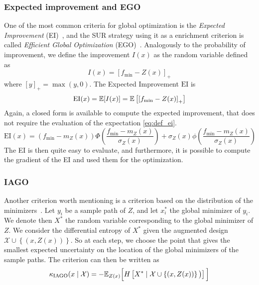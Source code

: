 \documentclass[../../Main_ManuscritThese.tex]{subfiles}
\begin{document}
\subsubsection{Expected improvement and EGO}
One of the most common criteria for global optimization is the \emph{Expected Improvement} (EI)~\cite{mockus_bayesian_1974}, and the SUR strategy using it as a enrichment criterion is called \emph{Efficient Global Optimization} (EGO)~\cite{jones_efficient_1998}.
Analogously to the probability of improvement, we define the improvement $I(x)$ as the random variable defined as
\begin{equation}
  \label{eq:def_improvement}
  I(x) = {\left[f_{\min} - Z(x)\right]}_+
\end{equation}
where $[y]_+ = \max(y, 0)$.
The Expected Improvement $\mathrm{EI}$ is 
\begin{align}
  \label{eq:def_ei}
  \mathrm{EI}(x) = \mathbb{E}[I(x)]  = \mathbb{E}\left[\left[f_{\min} - Z(x) \right]_+\right]
\end{align}
Again, a closed form is available to compute the expected improvement, that does not require the evaluation of the expectation \cref{eq:def_ei}.
\begin{equation}
  \mathrm{EI}(x) = \left(f_{\min} - m_Z(x)\right) \Phi\left(\frac{f_{\min} - m_Z(x)}{\sigma_Z(x)}\right) + \sigma_Z(x) \phi\left(\frac{f_{\min} - m_Z(x)}{\sigma_Z(x)}\right)
\end{equation}
The EI is then quite easy to evaluate, and furthermore, it is possible to compute the gradient of the EI and used them for the optimization.

\subsubsection{IAGO}
\label{ssec:IAGO} Another criterion worth mentioning is a criterion based on the distribution of the minimizers~\cite{villemonteix_informational_2006,hennig_entropy_2011}.
Let $y_i$ be a sample path of $Z$, and let $x_i^*$ the global minimizer of $y_i$.
We denote then $X^*$ the random variable corresponding to the global minimizer of $Z$.
We consider the differential entropy of $X^*$ given the augmented design $\mathcal{X} \cup \left\{\left(x,Z(x)\right)\right\}$.
 So at each step, we choose the point that gives the smallest expected uncertainty on the location of the global minimizers of the sample paths.
The criterion can then be written as
\begin{equation}
  \kappa_{\mathrm{IAGO}}(x \mid \mathcal{X})=-\mathbb{E}_{Z(x)}\Big[H\left[X^* \mid \mathcal{X} \cup \left\{(x, Z(x))\right\} \big)\right]\Big]
\end{equation}
\end{document}
